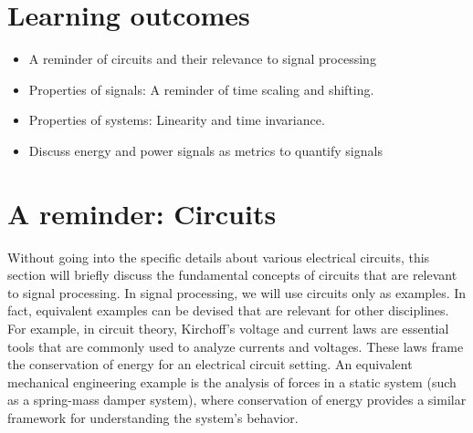 
\section{Learning outcomes}
\begin{itemize}
    \item A reminder of circuits and their relevance to signal processing
    \item Properties of signals: A reminder of time scaling and shifting.
    \item Properties of systems: Linearity and time invariance.
    \item Discuss energy and power signals as metrics to quantify signals
\end{itemize}

\section{A reminder: Circuits}
Without going into the specific details about various electrical circuits, this section will briefly discuss the fundamental concepts of circuits that are relevant to signal processing. In signal processing, we will use circuits only as examples. In fact, equivalent examples can be devised that are relevant for other disciplines. For example, in circuit theory, Kirchoff's voltage and current laws are essential tools that are commonly used to analyze currents and voltages. These laws frame the conservation of energy for an electrical circuit setting. An equivalent mechanical engineering example is the analysis of forces in a static system (such as a spring-mass damper system), where conservation of energy provides a similar framework for understanding the system's behavior. 

